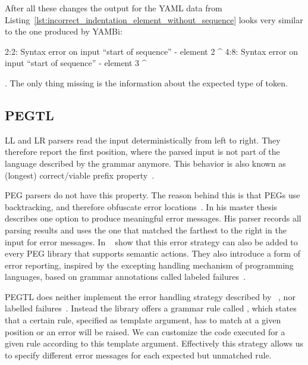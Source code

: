\newpage
After all these changes the output for the YAML data from Listing~\ref{lst:incorrect_indentation_element_without_sequence} looks very similar to the one produced by YAMBi:

\begin{textcode}
2:2: Syntax error on input “start of sequence”
      - element 2
      ^
4:8: Syntax error on input “start of sequence”
            - element 3
            ^
\end{textcode}

. The only thing missing is the information about the expected type of token.

\subsection{PEGTL}

LL and LR parsers read the input deterministically from left to right. They therefore report the first position, where the parsed input is not part of the language described by the grammar anymore. This behavior is also known as (longest) correct/viable prefix property~\cite{sippu1990parsing, ruefenacht2016error, maidl2016129}.

\Gls{PEG} parsers do not have this property. The reason behind this is that \glspl{PEG} use backtracking, and therefore obfuscate error locations~\cite{ruefenacht2016error}. In his master thesis~\cite{ford2002packrat} \citeauthor{ford2002packrat} describes one option to produce meaningful error messages. His parser records all parsing results and uses the one that matched the farthest to the right in the input for error messages. In ~\cite{maidl2016129} \citeauthor{maidl2016129} show that this error strategy can also be added to every \gls{PEG} library that supports semantic actions. They also introduce a form of error reporting, inspired by the excepting handling mechanism of programming languages, based on grammar annotations called labeled failures~\cite{maidl2016129}.

PEGTL does neither implement the error handling strategy described by \citeauthor{ford2002packrat}~\cite{ford2002packrat}, nor labelled failures~\cite{maidl2016129}. Instead the library offers a grammar rule called , which states that a certain rule, specified as template argument, has to match at a given position or an error will be raised. We can customize the code executed for a given  rule according to this template argument. Effectively this strategy allows us to specify different error messages for each expected but unmatched rule.

